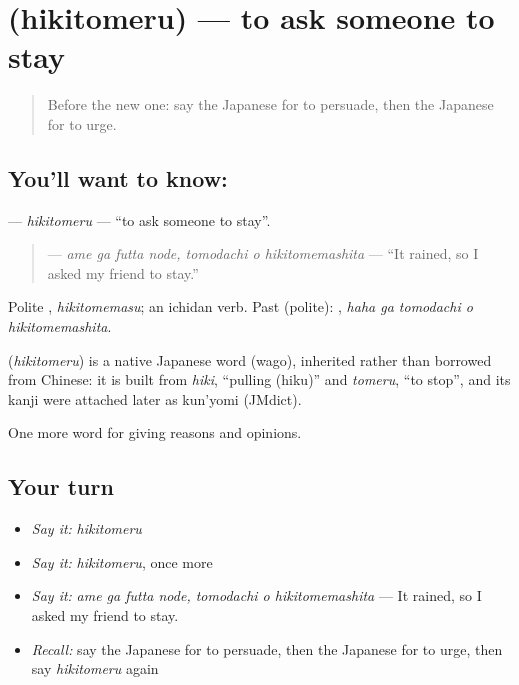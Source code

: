 \section[\texorpdfstring{\ja{ひきとめる} (hikitomeru)}{ひきとめる (hikitomeru)}]{ (hikitomeru) — to ask someone to stay}

\label{lesson:JA-C341-hikitomeru}



\begin{quote}
Before the new one: say the Japanese for to persuade, then the Japanese for to urge.
\end{quote}

\subsection*{You'll want to know: }
\textbf{} — \emph{hikitomeru} — \textquotedblleft{}to ask someone to stay\textquotedblright{}.

\begin{quote}
\textbf{  } — \emph{ame ga futta node, tomodachi o hikitomemashita} — \textquotedblleft{}It rained, so I asked my friend to stay.\textquotedblright{}
\end{quote}

Polite \textbf{}, \emph{hikitomemasu}; an ichidan verb. Past (polite): \textbf{  }, \emph{haha ga tomodachi o hikitomemashita}.

\begin{cousinweb}
\textbf{} (\emph{hikitomeru}) is a native Japanese word (wago), inherited rather than borrowed from Chinese: it is built from \emph{hiki}, \textquotedblleft{}pulling (hiku)\textquotedblright{} and \emph{tomeru}, \textquotedblleft{}to stop\textquotedblright{}, and its kanji were attached later as kun'yomi (JMdict).
\end{cousinweb}

\begin{grammarlens}[title={What you've built}]
One more word for giving reasons and opinions.
\end{grammarlens}

\subsection*{Your turn}
\begin{itemize}
\raggedright
  \item \emph{Say it:} \emph{hikitomeru}
  \item \emph{Say it:} \emph{hikitomeru}, once more
  \item \emph{Say it:} \emph{ame ga futta node, tomodachi o hikitomemashita} — It rained, so I asked my friend to stay.
  \item \emph{Recall:} say the Japanese for to persuade, then the Japanese for to urge, then say \emph{hikitomeru} again
\end{itemize}

